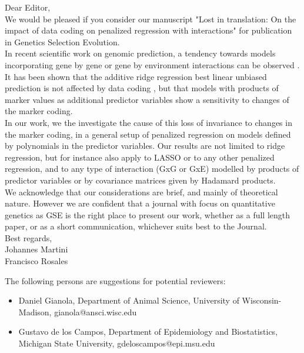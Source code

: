 \documentclass[review]{elsarticle}
\begin{document}
Dear Editor, \\

We would be pleased if you consider our manuscript "Lost in translation: On the impact of data coding
on penalized regression with interactions" for publication in Genetics Selection Evolution.  \\

In recent scientific work on genomic prediction, a tendency towards models incorporating gene by gene or gene by environment interactions can be observed \cite{ober15,jiang15,martini16,perez17}. 
It has been shown that the additive ridge regression best linear unbiased prediction is not affected by data coding \cite{stranden11,martini17}, but that models with products of marker values as additional predictor variables show a sensitivity to changes of the marker coding\cite{he2016does,martini17}.   \\

In our work, we the investigate the cause of this loss of invariance to changes in the marker coding, in a general setup of penalized regression on models defined by polynomials in the predictor variables. Our results are not limited to ridge regression, but for instance also apply to LASSO or to any other penalized regression, and to any type of interaction (GxG or GxE) modelled by products of predictor variables or by covariance matrices given by Hadamard products. \\

We acknowledge that our  considerations are brief, and mainly of theoretical nature. However we are confident that  a journal with focus on quantitative genetics as GSE is the right place to present our work, whether as a full length paper, or as a short communication, whichever suits best to the Journal. \\


Best regards, \\
Johannes Martini\\
Francisco Rosales \\ \vspace{1cm}


The following persons are suggestions for potential reviewers:
\begin{itemize}
	\item Daniel Gianola, Department of Animal Science, University of Wisconsin-Madison, gianola@ansci.wisc.edu 
	\item Gustavo de los Campos, Department of Epidemiology and Biostatistics,
	Michigan State University, gdeloscampos@epi.msu.edu
\end{itemize} 

\[\]



\end{document}

